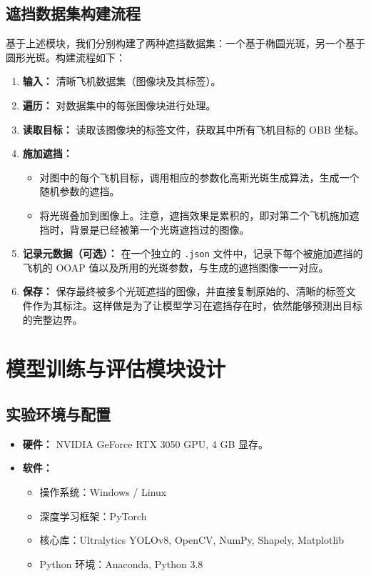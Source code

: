 \documentclass[12pt, a4paper]{report}
\begin{document}
\subsection{遮挡数据集构建流程}
基于上述模块，我们分别构建了两种遮挡数据集：一个基于椭圆光斑，另一个基于圆形光斑。构建流程如下：
\begin{enumerate}
    \item \textbf{输入：} 清晰飞机数据集（图像块及其标签）。
    \item \textbf{遍历：} 对数据集中的每张图像块进行处理。
    \item \textbf{读取目标：} 读取该图像块的标签文件，获取其中所有飞机目标的 OBB 坐标。
    \item \textbf{施加遮挡：}
    \begin{itemize}
        \item 对图中的每个飞机目标，调用相应的参数化高斯光斑生成算法，生成一个随机参数的遮挡。
        \item 将光斑叠加到图像上。注意，遮挡效果是累积的，即对第二个飞机施加遮挡时，背景是已经被第一个光斑遮挡过的图像。
    \end{itemize}
    \item \textbf{记录元数据（可选）：} 在一个独立的 \texttt{.json} 文件中，记录下每个被施加遮挡的飞机的 OOAP 值以及所用的光斑参数，与生成的遮挡图像一一对应。
    \item \textbf{保存：} 保存最终被多个光斑遮挡的图像，并直接复制原始的、清晰的标签文件作为其标注。这样做是为了让模型学习在遮挡存在时，依然能够预测出目标的完整边界。
\end{enumerate}

\section{模型训练与评估模块设计}
\subsection{实验环境与配置}
\begin{itemize}
    \item \textbf{硬件：} NVIDIA GeForce RTX 3050 GPU, 4 GB 显存。
    \item \textbf{软件：}
    \begin{itemize}
        \item 操作系统：Windows / Linux
        \item 深度学习框架：PyTorch
        \item 核心库：Ultralytics YOLOv8, OpenCV, NumPy, Shapely, Matplotlib
        \item Python 环境：Anaconda, Python 3.8
    \end{itemize}
\end{itemize}
\end{document}
